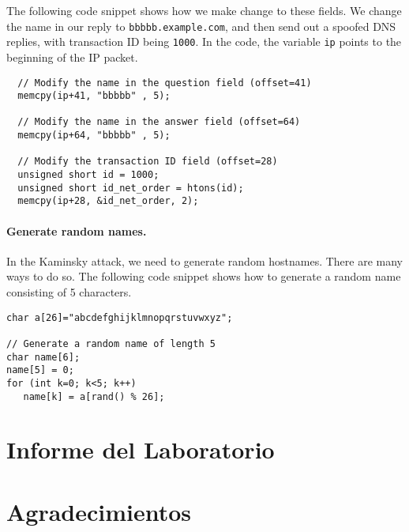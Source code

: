 The following code snippet shows how we make change to these fields. We change
the name in our reply to \texttt{bbbbb.example.com}, and then send out a
spoofed DNS replies, with transaction ID being \texttt{1000}.
In the code, the variable \texttt{ip} points to the beginning of the IP packet.  

\begin{lstlisting}
  // Modify the name in the question field (offset=41)
  memcpy(ip+41, "bbbbb" , 5);

  // Modify the name in the answer field (offset=64)
  memcpy(ip+64, "bbbbb" , 5);

  // Modify the transaction ID field (offset=28)
  unsigned short id = 1000;
  unsigned short id_net_order = htons(id);
  memcpy(ip+28, &id_net_order, 2);
\end{lstlisting}



\paragraph{Generate random names.} In the Kaminsky attack, we need to 
generate random hostnames. There are many ways to do so. The following 
code snippet shows how to generate a random name consisting of 
5 characters. 

\begin{lstlisting}
char a[26]="abcdefghijklmnopqrstuvwxyz";

// Generate a random name of length 5
char name[6];
name[5] = 0;
for (int k=0; k<5; k++)  
   name[k] = a[rand() % 26];
\end{lstlisting}
 



\section{Informe del Laboratorio}




\section*{Agradecimientos}




\thispagestyle{empty}

\def\baselinestretch{1}









